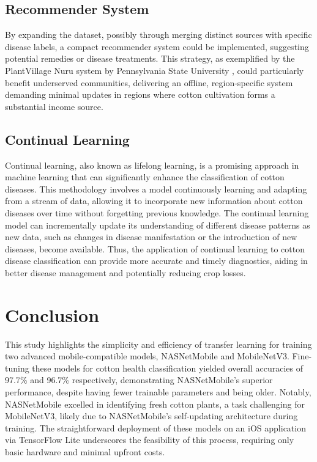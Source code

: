 \documentclass[conference]{IEEEtran}
\begin{document}
\subsection{Recommender System}

By expanding the dataset, possibly through merging distinct sources with specific disease labels, a compact recommender system could be implemented, suggesting potential remedies or disease treatments. This strategy, as exemplified by the PlantVillage Nuru system by Pennsylvania State University \cite{PlantVillage}, could particularly benefit underserved communities, delivering an offline, region-specific system demanding minimal updates in regions where cotton cultivation forms a substantial income source.

\subsection{Continual Learning}

Continual learning, also known as lifelong learning, is a promising approach in machine learning that can significantly enhance the classification of cotton diseases. This methodology involves a model continuously learning and adapting from a stream of data, allowing it to incorporate new information about cotton diseases over time without forgetting previous knowledge. The continual learning model can incrementally update its understanding of different disease patterns as new data, such as changes in disease manifestation or the introduction of new diseases, become available. Thus, the application of continual learning to cotton disease classification can provide more accurate and timely diagnostics, aiding in better disease management and potentially reducing crop losses.

\section{Conclusion}

This study highlights the simplicity and efficiency of transfer learning for training two advanced mobile-compatible models, NASNetMobile and MobileNetV3. Fine-tuning these models for cotton health classification yielded overall accuracies of 97.7\% and 96.7\% respectively, demonstrating NASNetMobile's superior performance, despite having fewer trainable parameters and being older. Notably, NASNetMobile excelled in identifying fresh cotton plants, a task challenging for MobileNetV3, likely due to NASNetMobile's self-updating architecture during training. The straightforward deployment of these models on an iOS application via TensorFlow Lite underscores the feasibility of this process, requiring only basic hardware and minimal upfront costs.
\end{document}
